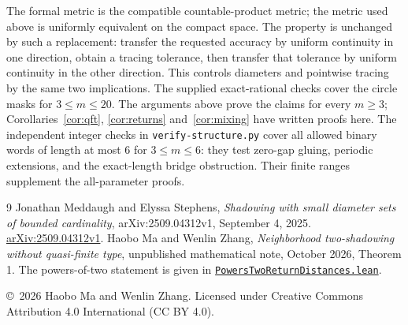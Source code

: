 \documentclass[11pt]{article}
\begin{document}
The formal metric is the compatible countable-product metric; the metric
used above is uniformly equivalent on the compact space. The property is
unchanged by such a replacement: transfer the requested accuracy by uniform
continuity in one direction, obtain a tracing tolerance, then transfer that
tolerance by uniform continuity in the other direction. This controls
diameters and pointwise tracing by the same two implications.
The supplied exact-rational checks cover the circle masks for
$3\leq m\leq20$. The arguments above prove the claims for every $m\geq3$;
Corollaries~\ref{cor:qft}, \ref{cor:returns} and~\ref{cor:mixing}
have written proofs here.
The independent integer checks in \texttt{verify-structure.py} cover all
allowed binary words of length at most $6$ for $3\leq m\leq6$: they
test zero-gap gluing, periodic extensions, and the exact-length bridge
obstruction. Their finite ranges supplement the all-parameter proofs.

\begin{thebibliography}{9}
 Jonathan Meddaugh and Elyssa Stephens,
\emph{Shadowing with small diameter sets of bounded cardinality},
arXiv:2509.04312v1, September 4, 2025.
\href{https://arxiv.org/abs/2509.04312v1}{arXiv:2509.04312v1}.
 Haobo Ma and Wenlin Zhang,
\emph{Neighborhood two-shadowing without quasi-finite type},
unpublished mathematical note, October 2026, Theorem 1.
The powers-of-two statement is given in
\href{https://github.com/the-omega-institute/trureturing/blob/147008bff5524a3dccf0efa3ed9e76fb6b168a50/D5/S1/Dynamics/Shadowing/PowersTwoReturnDistances.lean}{\texttt{PowersTwoReturnDistances.lean}}.
\end{thebibliography}
\smallskip\noindent\small
\copyright\ 2026 Haobo Ma and Wenlin Zhang.
Licensed under Creative Commons Attribution 4.0 International (CC BY 4.0).
\end{document}
